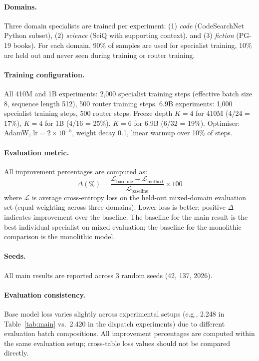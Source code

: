 \documentclass{article}
\begin{document}
\paragraph{Domains.} Three domain specialists are trained per experiment: (1) \emph{code} (CodeSearchNet Python subset), (2) \emph{science} (SciQ with supporting context), and (3) \emph{fiction} (PG-19 books). For each domain, 90\% of samples are used for specialist training, 10\% are held out and never seen during training or router training.

\paragraph{Training configuration.} All 410M and 1B experiments: 2,000 specialist training steps (effective batch size 8, sequence length 512), 500 router training steps. 6.9B experiments: 1,000 specialist training steps, 500 router steps. Freeze depth $K=4$ for 410M (4/24 = 17\%), $K=4$ for 1B (4/16 = 25\%), $K=6$ for 6.9B (6/32 = 19\%). Optimiser: AdamW, $\text{lr}=2\times10^{-5}$, weight decay 0.1, linear warmup over 10\% of steps.

\paragraph{Evaluation metric.} All improvement percentages are computed as:
\[
\Delta(\%) = \frac{\mathcal{L}_\text{baseline} - \mathcal{L}_\text{method}}{\mathcal{L}_\text{baseline}} \times 100
\]
where $\mathcal{L}$ is average cross-entropy loss on the held-out mixed-domain evaluation set (equal weighting across three domains). Lower loss is better; positive $\Delta$ indicates improvement over the baseline. The baseline for the main result is the best individual specialist on mixed evaluation; the baseline for the monolithic comparison is the monolithic model.

\paragraph{Seeds.} All main results are reported across 3 random seeds (42, 137, 2026).

\paragraph{Evaluation consistency.} Base model loss varies slightly across experimental setups (e.g., 2.248 in Table~\ref{tab:main} vs.\ 2.420 in the dispatch experiments) due to different evaluation batch compositions. All improvement percentages are computed within the same evaluation setup; cross-table loss values should not be compared directly.
\end{document}
